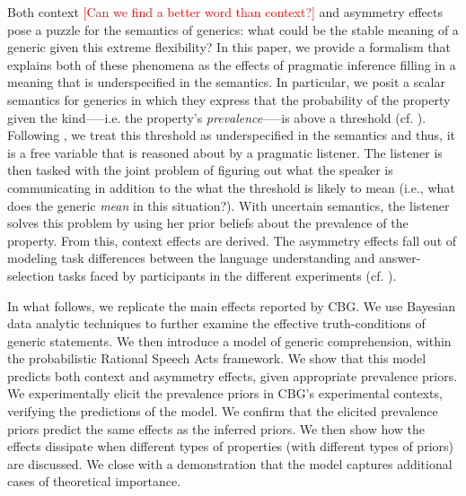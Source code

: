 \documentclass[10pt,letterpaper]{article}
\newcommand{\red}[1]{\textcolor{Red}{#1}}
\begin{document}
Both context \red{[Can we find a better word than context?]} and asymmetry effects pose a puzzle for the semantics of generics: what could be the stable meaning of a generic given this extreme flexibility? 
In this paper, we provide a formalism that explains both of these phenomena as the effects of pragmatic inference filling in a meaning that is underspecified in the semantics. 
%
In particular, we posit a scalar semantics for generics in which they express that the probability of the property given the kind-----i.e. the property's \emph{prevalence}-----is above a threshold (cf. ). Following , we treat this threshold as underspecified in the semantics and thus, it is a free variable that is reasoned about by a pragmatic listener. The listener is then tasked with the joint problem of figuring out what the speaker is communicating in addition to the what the threshold is likely to mean (i.e., what does the generic \emph{mean} in this situation?). 
%
With uncertain semantics, the listener solves this problem by using her prior beliefs about the prevalence of the property. From this, context effects are derived. The asymmetry effects fall out of modeling task differences between the language understanding and answer-selection tasks faced by participants in the different experiments (cf. ).  %


In what follows, we replicate the main effects reported by CBG. We use Bayesian data analytic techniques to further examine the effective truth-conditions of generic statements. We then introduce a model of generic comprehension, within the probabilistic Rational Speech Acts framework. We show that this model predicts both context and asymmetry effects, given appropriate prevalence priors. We experimentally elicit the prevalence priors in CBG's experimental contexts, verifying the predictions of the model. We confirm that the elicited prevalence priors predict the same effects as the inferred priors. We then show how the effects dissipate when different types of properties (with different types of priors) are discussed. We close with a demonstration that the model captures additional cases of theoretical importance.
\end{document}
